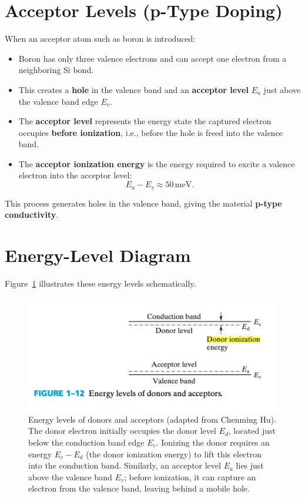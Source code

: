 \documentclass[12pt]{article}
\begin{document}
	\section{Acceptor Levels (p-Type Doping)}
	When an acceptor atom such as boron is introduced:
	\begin{itemize}
		\item Boron has only three valence electrons and can accept one electron from a neighboring Si bond.
		\item This creates a \textbf{hole} in the valence band and an \textbf{acceptor level} \(E_a\) just above the valence band edge \(E_v\).
		\item The \textbf{acceptor level} represents the energy state the captured electron occupies \textbf{before ionization}, i.e., before the hole is freed into the valence band.
		\item The \textbf{acceptor ionization energy} is the energy required to excite a valence electron into the acceptor level:
		\[
		E_a - E_v \approx 50\,\text{meV}.
		\]
	\end{itemize}
	This process generates holes in the valence band, giving the material \textbf{p-type conductivity}.
	
	\section{Energy-Level Diagram}
	Figure~\ref{fig:donor_acceptor} illustrates these energy levels schematically.
	
	\begin{figure}[h!]
		\centering
		\includegraphics[width=0.75\linewidth]{donor_acceptor_level.png}
		\caption{Energy levels of donors and acceptors (adapted from Chenming Hu). 
			The donor electron initially occupies the donor level \(E_d\), located just below the conduction band edge \(E_c\). 
			Ionizing the donor requires an energy \(E_c - E_d\) (the donor ionization energy) to lift this electron into the conduction band. 
			Similarly, an acceptor level \(E_a\) lies just above the valence band \(E_v\); before ionization, it can capture an electron from the valence band, leaving behind a mobile hole.}
		\label{fig:donor_acceptor}
	\end{figure}
	
\end{document}
